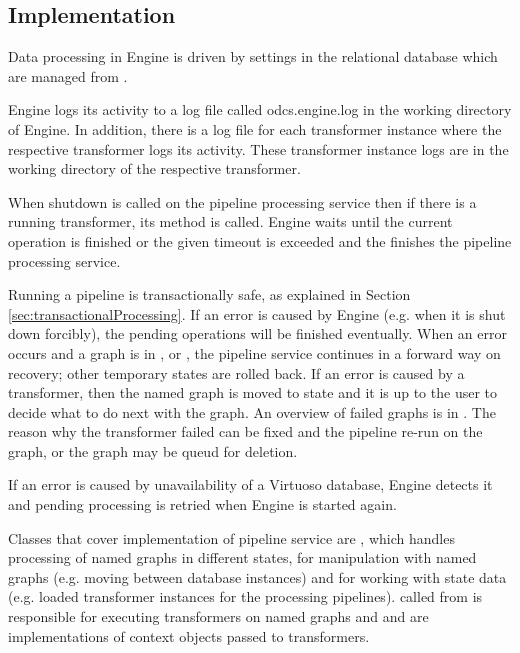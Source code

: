 \subsection{Implementation}
Data processing in Engine is driven by settings in the relational database which are managed from \FE. 

Engine logs its activity to a log file called odcs.engine.log in the working directory of Engine. In addition, there is a log file for each transformer instance where the respective transformer logs its activity. These transformer instance logs are in the working directory of the respective transformer.

When shutdown is called on the pipeline processing service then if there is a running transformer, its  method is called. Engine waits until the current operation is finished or the given timeout is exceeded and the finishes the pipeline processing service. 

Running a pipeline is transactionally safe, as explained in Section \ref{sec:transactionalProcessing}.  If an error is caused by Engine (e.g. when it is shut down forcibly), the pending operations will be finished eventually. When an error occurs and a graph is in ,  or , the pipeline service continues in a forward way on recovery; other temporary states are rolled back. If an error is caused by a transformer, then the named graph is moved to state  and it is up to the user to decide what to do next with the graph. An overview of failed graphs is in \FE. The reason why the transformer failed can be fixed and the pipeline re-run on the graph, or the graph may be queud for deletion.

If an error is caused by unavailability of a Virtuoso database, Engine detects it and pending processing is retried when Engine is started again.

Classes that cover implementation of pipeline service are , which handles processing of named graphs in different states,  for manipulation with named graphs (e.g. moving between database instances) and  for working with state data (e.g. loaded transformer instances for the processing pipelines).  called from  is responsible for executing transformers on named graphs and  and  are implementations of context objects passed to transformers.


